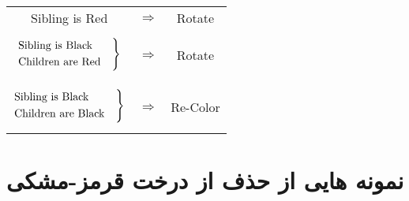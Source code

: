 \documentclass[12pt]{article}
\begin{document}
\begin{latin}
\begin{center}
  \bgroup
  \def\arraystretch{1.5}%
  \begin{tabular}{ C F C }
    Sibling is Red
    &
    $\Longrightarrow$
    &
	Rotate
     \\ 
     $$
      \begin{rcases}
      \text{Sibling is Black} & \\
      \text{Children are Red} &
      \end{rcases}
      $$
    &
    $\Longrightarrow$
    &
	Rotate
     \\ 
     $$
     \begin{rcases}
      \text{Sibling is Black} & \\
      \text{Children are Black} &
     \end{rcases}
     $$
    &
    $\Longrightarrow$
    &
    Re-Color
     \\ 
  \end{tabular}
  \egroup
\end{center}
\end{latin}






\section{نمونه هایی از حذف از درخت قرمز-مشکی}
\end{document}
